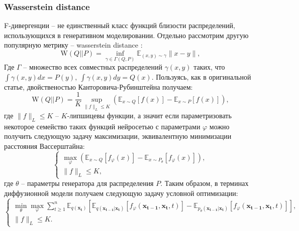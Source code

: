 \documentclass{article}
\begin{document}
\subsubsection{Wasserstein distance}
F-дивергенции -- не единственный класс функций близости распределений, использующихся в генеративном моделировании. Отдельно рассмотрим другую популярную метрику -- wasserstein distance \cite{https://doi.org/10.48550/arxiv.1701.07875, DBLP:journals/corr/GulrajaniAADC17}:
\begin{equation}
	\text{W}(Q||P) = \inf\limits_{\gamma \in \Gamma(Q,P)} \mathbb{E}_{(x,y)\sim \gamma} \|x-y\|,
\end{equation}
Где $\Gamma$ -- множество всех совместных распределений  $\gamma(x,y)$ таких, что $\int \gamma(x,y) dx = P(y),~\int \gamma(x,y) dy = Q(x)$. Пользуясь, как в оригинальной статье, двойственостью Канторовича-Рубинштейна получаем:
\begin{equation}
	\text{W}(Q||P) = \frac{1}{K}\sup\limits_{\|f\|_L\leqslant K}\left( \mathbb{E}_{x\sim Q} [f(x)] - \mathbb{E}_{x\sim P} [f(x)]\right),
\end{equation}
где $\|f\|_L\leqslant K$ -- $K$-липшицевы функции, а значит если параметризовать некоторое семейство таких функций нейросетью с параметрами $\varphi$ можно получить следующую задачу максимизации, эквивалентную минимизации расстояния Вассерштайна:
\begin{equation}
	\begin{cases}
	\max\limits_{\varphi}\left(\mathbb{E}_{x\sim Q} [f_\varphi(x)] - \mathbb{E}_{x\sim P_\theta} [f_\varphi(x)]\right),\\
		\|f\|_L \leqslant K,
\end{cases}
\end{equation}
где $\theta$ -- параметры генератора для распределения $P$. Таким образом, в терминах диффузионной модели получаем следующую задачу условной оптимизации:
\begin{equation}
	\begin{cases}
	\min\limits_\theta\max\limits_\varphi\sum\limits_{t\geqslant 1}^n \mathbb{E}_{q(\mathbf{x_t})}\left[\mathbb{E}_{q(\mathbf{x_{t-1}}|\mathbf{x_t})}\left[f_\varphi(\mathbf{x_{t-1}}, \mathbf{x_t}, t)\right] - \mathbb{E}_{p_\theta(\mathbf{x_{t-1}}|\mathbf{x_t})}\left[f_\varphi(\mathbf{x_{t-1}}, \mathbf{x_t}, t)\right]\right],\\
	\|f\|_L \leqslant K.
	\end{cases}
\end{equation}\\
\end{document}
